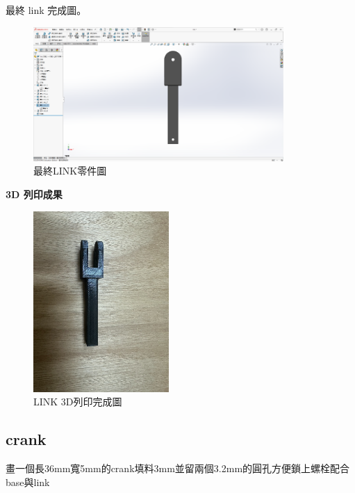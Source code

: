 \newpage

最終 link 完成圖。

\begin{figure}[htbp]
    \centering
    \includegraphics[width=0.85\textwidth]{./../images/6-1-44}
    \caption{最終LINK零件圖}
\end{figure}

\textbf{3D 列印成果}

\begin{figure}[htbp]
    \centering
    \includegraphics[width=0.46\textwidth]{./../images/6-1-23}
    \caption{LINK 3D列印完成圖}
\end{figure}

\newpage

\subsection*{crank}

畫一個長36mm寬5mm的crank填料3mm並留兩個3.2mm的圓孔方便鎖上螺栓配合base與link


